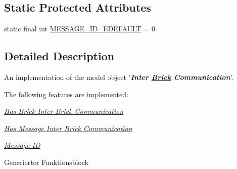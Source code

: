 \subsection*{Static Protected Attributes}
\begin{DoxyCompactItemize}
\item 
static final int \hyperlink{classshootingmachineemfmodel_1_1impl_1_1_inter_brick_communication_impl_a7bc71e77fb5709025d118e5488d34663}{M\-E\-S\-S\-A\-G\-E\-\_\-\-I\-D\-\_\-\-E\-D\-E\-F\-A\-U\-L\-T} = 0
\end{DoxyCompactItemize}


\subsection{Detailed Description}
An implementation of the model object '{\itshape {\bfseries Inter \hyperlink{interfaceshootingmachineemfmodel_1_1_brick}{Brick} Communication}}'.

The following features are implemented\-: 
\begin{DoxyItemize}
\item \hyperlink{classshootingmachineemfmodel_1_1impl_1_1_inter_brick_communication_impl_ad80b7d688bd27d99cefbe9a99f4fd518}{{\itshape Has Brick Inter Brick Communication}} 
\item \hyperlink{classshootingmachineemfmodel_1_1impl_1_1_inter_brick_communication_impl_ac39dee92ed6a0c0e6a4c3df0b7a68f26}{{\itshape Has Message Inter Brick Communication}} 
\item \hyperlink{classshootingmachineemfmodel_1_1impl_1_1_inter_brick_communication_impl_ace5e994ef218bf1074d002ebaef563b0}{{\itshape Message I\-D}} 
\end{DoxyItemize}

Generierter Funktionsblock 

